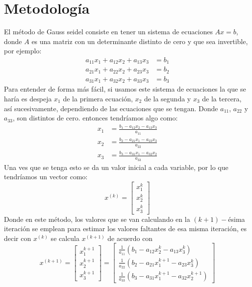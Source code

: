 \documentclass[12pt]{article}
\begin{document}
		\section*{\centering Metodología}\label{sec:Metodologia}
			El método de Gauss seidel consiste en tener un sistema de ecuaciones $ Ax = b $,  donde $ A $ es una 
			matriz con un determinante distinto de cero y que sea invertible, por ejemplo:
			\begin{align*}
				a_{11}x_1 + a_{12}x_2 + a_{13}x_3 &= b_1 \\
				a_{21}x_1 + a_{22}x_2 + a_{23}x_3 &= b_2 \\
				a_{31}x_1 + a_{32}x_2 + a_{33}x_3 &= b_3
			\end{align*}
			Para entender de forma más fácil, si usamos este sistema de ecuaciones la que se haría es despeja 
			$ x_1 $ de la primera ecuación, $ x_2 $ de la segunda y $ x_ 3 $ de la tercera, así sucesivamente, 
			dependiendo de las ecuaciones que se tengan. Donde $ a_{11} $, $ a_{22} $ y $ a_{33} $, son distintos 
			de cero. entonces tendríamos algo como:
			\begin{align*}
				x_1 &= \frac{b_1 - a_{12}x_2 - a_{13}x_3}{a_{11}} \\
				x_2 &= \frac{b_2 - a_{21}x_1 - a_{23}x_3}{a_{22}} \\
				x_3 &= \frac{b_3 - a_{31}x_1 - a_{32}x_2}{a_{33}}
			\end{align*}
			Una ves que se tenga esto se da un valor inicial a cada variable, por lo que tendríamos un vector como:
			$$
			x^{(k)} =
			\left[\begin{array}{c}
				x_1^k \\
				x_2^k \\
				x_3^k 
			\end{array}\right]
			$$
			Donde en este método, los valores que se van calculando en la $(k+1)-$ésima iteración se emplean para 
			estimar los valores faltantes de esa misma iteración, es decir con $ x^{(k)} $ se calcula $ x^{(k+1)} $ 
			de acuerdo con
			$$
			x^{(k+1)} =
			\left[\begin{array}{c}
				x_1^{k+1} \\
				x_2^{k+1} \\
				x_3^{k+1} 
			\end{array}\right]
			=
			\left[\begin{array}{c}
				\frac{1}{a_{11}}(b_1 - a_{12}x_2^k - a_{13}x_3^k) \\
				\frac{1}{a_{22}}(b_2 - a_{21}x_1^{k+1} - a_{23}x_3^k) \\
				\frac{1}{a_{33}}(b_3 - a_{31}x_1^{k+1} - a_{32}x_2^{k+1})
			\end{array}\right]
			$$
\end{document}
